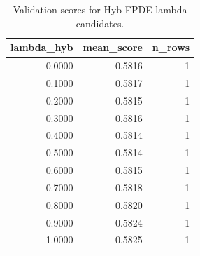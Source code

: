 \begin{table}[t]
\caption{Validation scores for Hyb-FPDE lambda candidates.}
\label{tab:lambda_distribution_computed}
\centering
\begin{tabular}{rrr}
\toprule
lambda\_hyb & mean\_score & n\_rows \\
\midrule
0.0000 & 0.5816 & 1 \\
0.1000 & 0.5817 & 1 \\
0.2000 & 0.5815 & 1 \\
0.3000 & 0.5816 & 1 \\
0.4000 & 0.5814 & 1 \\
0.5000 & 0.5814 & 1 \\
0.6000 & 0.5815 & 1 \\
0.7000 & 0.5818 & 1 \\
0.8000 & 0.5820 & 1 \\
0.9000 & 0.5824 & 1 \\
1.0000 & 0.5825 & 1 \\
\bottomrule
\end{tabular}

\end{table}
